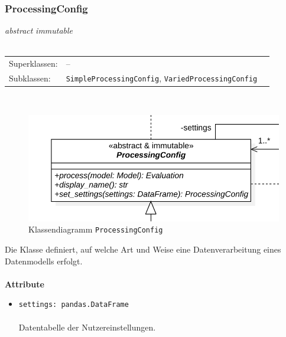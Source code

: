 \documentclass{article}
\begin{document}
\subsubsection*{\large{\textbf{ProcessingConfig}\label{cls:ProcessingConfig}}}
\textit{\flqq{}abstract\frqq} \textit{\flqq{}immutable\frqq}\normalsize\\\\
\begin{tabular}{lll}
 Superklassen: & --\\
 Subklassen: & \texttt{SimpleProcessingConfig}, \texttt{VariedProcessingConfig}
\end{tabular}\\
\begin{figure}[H]%
    \centering
    \includegraphics[width=13cm]{entwurf/Entwurf_dokument/img/cls/model/ProcessingConfig.png}
    \caption{Klassendiagramm \texttt{ProcessingConfig}}
\end{figure}

Die Klasse definiert, auf welche Art und Weise eine Datenverarbeitung eines Datenmodells erfolgt.
\\\\

\textbf{Attribute}
\begin{itemize}\setlength\itemsep{3em}
\item \texttt{settings: pandas.DataFrame}\\\\
Datentabelle der Nutzereinstellungen.
\\\\
\end{itemize}
\end{document}
